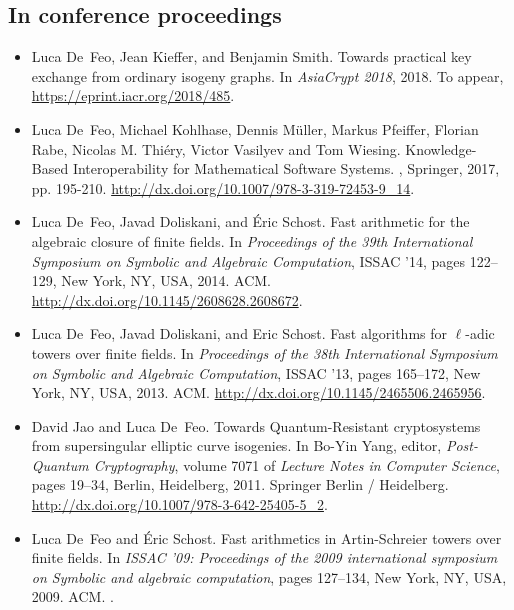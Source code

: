 \documentclass{book}
\begin{document}
\subsection*{In conference proceedings}
\begin{itemize}
\item
Luca De~Feo, Jean Kieffer, and Benjamin Smith.
\newblock Towards practical key exchange from ordinary isogeny graphs.
\newblock In {\em AsiaCrypt 2018}, 2018.
\newblock To appear, \url{https://eprint.iacr.org/2018/485}.

\item
  Luca De~Feo, Michael Kohlhase, Dennis Müller, Markus Pfeiffer, Florian Rabe, Nicolas M. Thiéry, Victor Vasilyev and Tom Wiesing.
  \newblock Knowledge-Based Interoperability for Mathematical Software Systems.
  , Springer, 2017, pp. 195-210.
  \newblock \url{http://dx.doi.org/10.1007/978-3-319-72453-9_14}.

\item
Luca De~Feo, Javad Doliskani, and \'{E}ric Schost.
\newblock Fast arithmetic for the algebraic closure of finite fields.
\newblock In {\em Proceedings of the 39th International Symposium on Symbolic
  and Algebraic Computation}, ISSAC '14, pages 122--129, New York, NY, USA,
  2014. ACM.
  \newblock \url{http://dx.doi.org/10.1145/2608628.2608672}.
  
\item
Luca De~Feo, Javad Doliskani, and Eric Schost.
\newblock Fast algorithms for $\ell$-adic towers over finite fields.
\newblock In {\em Proceedings of the 38th International Symposium on Symbolic
  and Algebraic Computation}, ISSAC '13, pages 165--172, New York, NY, USA,
  2013. ACM.
  \newblock \url{http://dx.doi.org/10.1145/2465506.2465956}.
  
\item
David Jao and Luca De~Feo.
\newblock Towards {Quantum-Resistant} cryptosystems from supersingular elliptic
  curve isogenies.
\newblock In Bo-Yin Yang, editor, {\em Post-Quantum Cryptography}, volume 7071
  of {\em Lecture Notes in Computer Science}, pages 19--34, Berlin, Heidelberg,
  2011. Springer Berlin / Heidelberg.
  \newblock \url{http://dx.doi.org/10.1007/978-3-642-25405-5_2}.
  
\item
Luca De~Feo and \'{E}ric Schost.
\newblock Fast arithmetics in {A}rtin-{S}chreier towers over finite fields.
\newblock In {\em ISSAC '09: Proceedings of the 2009 international symposium on
  Symbolic and algebraic computation}, pages 127--134, New York, NY, USA, 2009.
ACM.
  \newblock \url{}.
\end{itemize}
\end{document}
